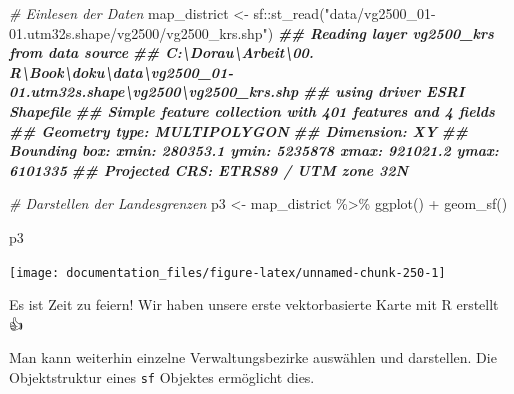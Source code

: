 \documentclass[
]{article}
\newenvironment{Shaded}{\begin{snugshade}}{\end{snugshade}}
\newcommand{\CommentTok}[1]{\textcolor[rgb]{0.56,0.35,0.01}{\textit{#1}}}
\newcommand{\DocumentationTok}[1]{\textcolor[rgb]{0.56,0.35,0.01}{\textbf{\textit{#1}}}}
\newcommand{\FunctionTok}[1]{\textcolor[rgb]{0.00,0.00,0.00}{#1}}
\newcommand{\NormalTok}[1]{#1}
\newcommand{\OtherTok}[1]{\textcolor[rgb]{0.56,0.35,0.01}{#1}}
\newcommand{\SpecialCharTok}[1]{\textcolor[rgb]{0.00,0.00,0.00}{#1}}
\newcommand{\StringTok}[1]{\textcolor[rgb]{0.31,0.60,0.02}{#1}}
\begin{document}
\begin{Shaded}
\begin{Highlighting}[]

\CommentTok{\# Einlesen der Daten}
\NormalTok{map\_district }\OtherTok{\textless{}{-}}\NormalTok{ sf}\SpecialCharTok{::}\FunctionTok{st\_read}\NormalTok{(}\StringTok{"data/vg2500\_01{-}01.utm32s.shape/vg2500/vg2500\_krs.shp"}\NormalTok{)}
\DocumentationTok{\#\# Reading layer \textasciigrave{}vg2500\_krs\textquotesingle{} from data source }
\DocumentationTok{\#\#   \textasciigrave{}C:\textbackslash{}Dorau\textbackslash{}Arbeit\textbackslash{}00. R\textbackslash{}Book\textbackslash{}doku\textbackslash{}data\textbackslash{}vg2500\_01{-}01.utm32s.shape\textbackslash{}vg2500\textbackslash{}vg2500\_krs.shp\textquotesingle{} }
\DocumentationTok{\#\#   using driver \textasciigrave{}ESRI Shapefile\textquotesingle{}}
\DocumentationTok{\#\# Simple feature collection with 401 features and 4 fields}
\DocumentationTok{\#\# Geometry type: MULTIPOLYGON}
\DocumentationTok{\#\# Dimension:     XY}
\DocumentationTok{\#\# Bounding box:  xmin: 280353.1 ymin: 5235878 xmax: 921021.2 ymax: 6101335}
\DocumentationTok{\#\# Projected CRS: ETRS89 / UTM zone 32N}

\CommentTok{\# Darstellen der Landesgrenzen}
\NormalTok{p3 }\OtherTok{\textless{}{-}}\NormalTok{ map\_district }\SpecialCharTok{\%\textgreater{}\%}
  \FunctionTok{ggplot}\NormalTok{() }\SpecialCharTok{+} 
  \FunctionTok{geom\_sf}\NormalTok{()}

\NormalTok{p3}
\end{Highlighting}
\end{Shaded}

\begin{center}\texttt{[image: documentation\_files/figure-latex/unnamed-chunk-250-1]} \end{center}

Es ist Zeit zu feiern! Wir haben unsere erste vektorbasierte Karte mit R erstellt 👍

Man kann weiterhin einzelne Verwaltungsbezirke auswählen und darstellen. Die Objektstruktur eines \texttt{sf} Objektes ermöglicht dies.
\end{document}
